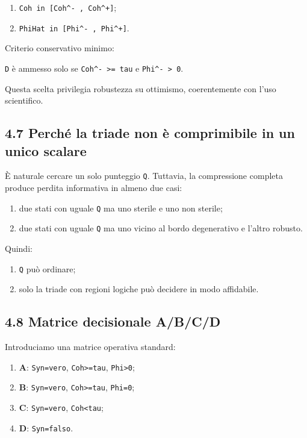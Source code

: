 \begin{enumerate}
\def\labelenumi{\arabic{enumi}.}
\tightlist
\item
  \texttt{Coh\ in\ {[}Coh\^{}-\ ,\ Coh\^{}+{]}};
\item
  \texttt{PhiHat\ in\ {[}Phi\^{}-\ ,\ Phi\^{}+{]}}.
\end{enumerate}

Criterio conservativo minimo:

\texttt{D} è ammesso solo se \texttt{Coh\^{}-\ \textgreater{}=\ tau} e \texttt{Phi\^{}-\ \textgreater{}\ 0}.

Questa scelta privilegia robustezza su ottimismo, coerentemente con l'uso scientifico.

\subsection{4.7 Perché la triade non è comprimibile in un unico scalare}

È naturale cercare un solo punteggio \texttt{Q}. Tuttavia, la compressione completa produce perdita informativa in almeno due casi:

\begin{enumerate}
\def\labelenumi{\arabic{enumi}.}
\tightlist
\item
  due stati con uguale \texttt{Q} ma uno sterile e uno non sterile;
\item
  due stati con uguale \texttt{Q} ma uno vicino al bordo degenerativo e l'altro robusto.
\end{enumerate}

Quindi:

\begin{enumerate}
\def\labelenumi{\arabic{enumi}.}
\tightlist
\item
  \texttt{Q} può ordinare;
\item
  solo la triade con regioni logiche può decidere in modo affidabile.
\end{enumerate}

\subsection{4.8 Matrice decisionale A/B/C/D}

Introduciamo una matrice operativa standard:

\begin{enumerate}
\def\labelenumi{\arabic{enumi}.}
\tightlist
\item
  \textbf{A}: \texttt{Syn=vero}, \texttt{Coh\textgreater{}=tau}, \texttt{Phi\textgreater{}0};
\item
  \textbf{B}: \texttt{Syn=vero}, \texttt{Coh\textgreater{}=tau}, \texttt{Phi=0};
\item
  \textbf{C}: \texttt{Syn=vero}, \texttt{Coh\textless{}tau};
\item
  \textbf{D}: \texttt{Syn=falso}.
\end{enumerate}

